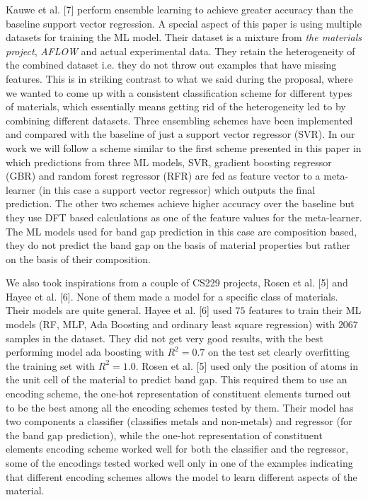 \documentclass{article}
\begin{document}
Kauwe et al. [7] perform ensemble learning to achieve greater accuracy than the baseline support vector regression. A special aspect of this paper is using multiple datasets for training the ML model. Their dataset is a mixture from \emph{the materials project}, \emph{AFLOW} and actual experimental data. They retain the heterogeneity of the combined dataset i.e. they do not throw out examples that have missing features. This is in striking contrast to what we said during the proposal, where we wanted to come up with a consistent classification scheme for different types of materials, which essentially means getting rid of the heterogeneity led to by combining different datasets. Three ensembling schemes have been implemented and compared with the baseline of just a support vector regressor (SVR). In our work we will follow a scheme similar to the first scheme presented in this paper in which predictions from three ML models, SVR, gradient boosting regressor (GBR) and random forest regressor (RFR) are fed as feature vector to a meta-learner (in this case a support vector regressor) which outputs the final prediction. The other two schemes achieve higher accuracy over the baseline but they use DFT based calculations as one of the feature values for the meta-learner. The ML models used for band gap prediction in this case are composition based, they do not predict the band gap on the basis of material properties but rather on the basis of their composition. \par
We also took inspirations from a couple of CS229 projects, Rosen et al. [5] and Hayee et al. [6]. None of them made a model for a specific class of materials. Their models are quite general. Hayee et al. [6] used $75$ features to train their ML models (RF, MLP, Ada Boosting and ordinary least square regression) with $2067$ samples in the dataset. They did not get very good results, with the best performing model ada boosting with $R^2 = 0.7$ on the test set clearly overfitting the training set with $R^2 = 1.0$. Rosen et al. [5] used only the position of atoms in the unit cell of the material to predict band gap. This required them to use an encoding scheme, the one-hot representation of constituent elements turned out to be the best among all the encoding schemes tested by them. Their model has two components a classifier (classifies metals and non-metals) and regressor (for the band gap prediction), while the one-hot representation of constituent elements encoding scheme worked well for both the classifier and the regressor, some of the encodings tested worked well only in one of the examples indicating that different encoding schemes allows the model to learn different aspects of the material. 
\end{document}

